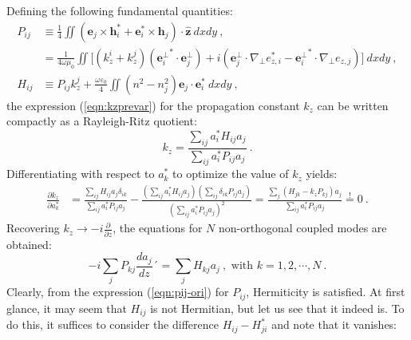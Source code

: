 Defining the following fundamental quantities:
\begin{align}
	P_{ij} &\equiv \frac{1}{4} \iint \left( \textbf{e}_j \times \textbf{h}_i^* + \textbf{e}_i^* \times \textbf{h}_j \right) \cdot \hat{\textbf{z}} \  dxdy \ , \label{eqn:pij-ori} \\
	&= \frac{1}{4 \omega \mu_0} \iint \Big[ 
	(k_z^i + k_z^j) \left( {\textbf{e}_i^\perp}^* \cdot \textbf{e}_j^\perp  \right)  + i \left( \textbf{e}_j^\perp \cdot \nabla_\perp e_{z,i}^* - {\textbf{e}_i^\perp}^* \cdot \nabla_\perp e_{z,j} \right) \Big] \ dxdy \ , \label{eqn:pij-simpli} \\
	H_{ij} &\equiv P_{ij} k_z^j + \frac{\omega \varepsilon_0}{4} \iint (n^2-n_j^2) \textbf{e}_j \cdot \textbf{e}_i^* \ dxdy \ , \label{eqn:hij}
\end{align}
the expression (\ref{eqn:kzprevar}) for the propagation constant $k_z$ can be written compactly as a Rayleigh-Ritz quotient:
\begin{equation}
	k_z = \frac{\sum_{ij} a_i^* H_{ij} a_j}{\sum_{ij} a_i^*P_{ij} a_j} \ .
\end{equation}
Differentiating with respect to $a_k^*$ to optimize the value of $k_z$ yields:
\begin{align}
	\frac{\partial k_z}{\partial a_k^*} &= \frac{\sum_{ij} H_{ij} a_j \delta_{ik}}{\sum_{ij} a_i^*P_{ij} a_j} - \frac{\left(\sum_{ij} a_i^* H_{ij} a_j\right) \left( 
	\sum_{ij} \delta_{ik} P_{ij} a_j \right) }{\left(\sum_{ij} a_i^*P_{ij} a_j\right)^2} = \frac{\sum_{j} \left(H_{jk}  - k_z P_{kj} \right) a_j}{\sum_{ij} a_i^* P_{ij}a_j} \overset{!}{=} 0 \ .
\end{align}
Recovering $k_z \to -i\frac{\partial}{\partial z}$, the equations for $N$ non-orthogonal coupled modes are obtained:
\begin{equation}
	-i \sum_{j} P_{kj} \frac{d a_j}{dz} ´= \sum_{j} H_{kj} a_j \ , \text{ with }k=1,2,\cdots,N \ . \label{eqn:non-ortho-CMT-eqs}
\end{equation}
Clearly, from the expression (\ref{eqn:pij-ori}) for $P_{ij}$, Hermiticity is satisfied. At first glance, it may seem that $H_{ij}$ is not Hermitian, but let us see that it indeed is. To do this, it suffices to consider the difference $H_{ij} - H_{ji}^*$ and note that it vanishes:
